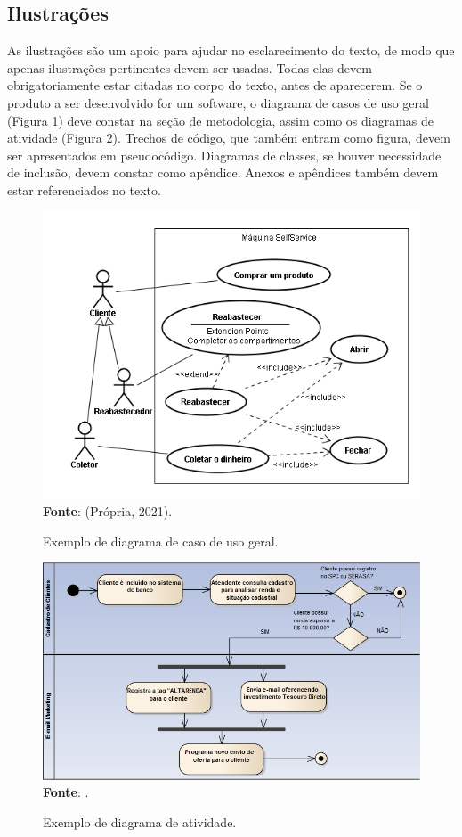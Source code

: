 \subsection{Ilustrações}\label{sec:Ilustracoes}
As ilustrações são um apoio para ajudar no esclarecimento do texto, de modo que apenas ilustrações pertinentes devem ser usadas. Todas elas devem obrigatoriamente estar citadas no corpo do texto, antes de aparecerem. 
Se o produto a ser desenvolvido for um software, o diagrama de casos de uso geral (Figura \ref{fig:CasoDeUso}) deve constar na seção de metodologia, assim como os diagramas de atividade (Figura \ref{fig:Atividades}). Trechos de código, que também entram como figura, devem ser apresentados em pseudocódigo. Diagramas de classes, se houver necessidade de inclusão, devem constar como apêndice. Anexos e apêndices também devem estar referenciados no texto. 

\begin{figure}[htb]
	\centering
	\caption{Exemplo de diagrama de caso de uso geral.}
	\includegraphics[scale=0.6]{imagens/DiagramaCasoDeUso.png} 
	\newline \textbf{Fonte}: (Própria, 2021).
	\label{fig:CasoDeUso}
\end{figure}

\begin{figure}[htb]
	\centering
	\caption{Exemplo de diagrama de atividade.}
	\includegraphics[scale=0.6]{imagens/DiagramaAtividades.png} 
	\newline \textbf{Fonte}: \cite{Ventura2018}.
	\label{fig:Atividades}
\end{figure}
